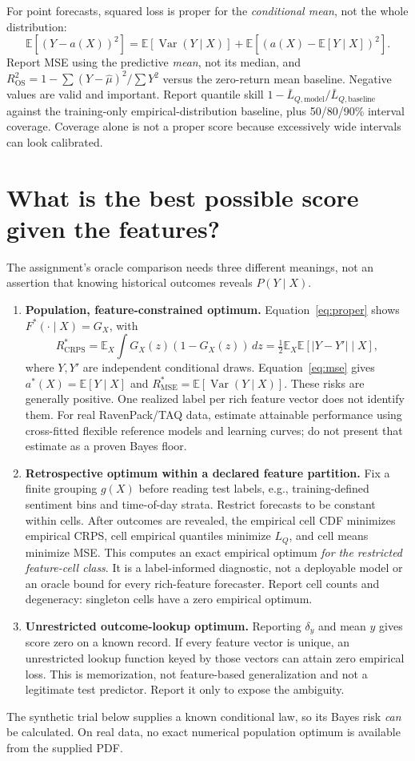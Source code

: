 \documentclass[11pt,letterpaper]{article}
\newcommand{\E}{\mathbb{E}}
\newcommand{\CRPS}{\operatorname{CRPS}}
\newcommand{\MSE}{\operatorname{MSE}}
\newcommand{\Var}{\operatorname{Var}}
\begin{document}
For point forecasts, squared loss is proper for the \emph{conditional mean}, not the whole distribution:
\begin{equation}
\E[(Y-a(X))^2]=\E[\Var(Y\mid X)]+\E[(a(X)-\E[Y\mid X])^2].
\label{eq:mse}
\end{equation}
Report MSE using the predictive \emph{mean}, not its median, and
$R^2_{\mathrm{OS}}=1-\sum(Y-\widehat\mu)^2/\sum Y^2$ versus the zero-return mean baseline. Negative values are valid and important. Report quantile skill $1-\bar L_{Q,\mathrm{model}}/\bar L_{Q,\mathrm{baseline}}$ against the training-only empirical-distribution baseline, plus 50/80/90\% interval coverage. Coverage alone is not a proper score because excessively wide intervals can look calibrated.

\section{What is the best possible score given the features?}
The assignment's oracle comparison needs three different meanings, not an assertion that knowing historical outcomes reveals $P(Y\mid X)$.
\begin{enumerate}
\item \textbf{Population, feature-constrained optimum.} Equation~\eqref{eq:proper} shows $F^*(\cdot\mid X)=G_X$, with
\begin{equation}
R^*_{\CRPS}=\E_X\int G_X(z)(1-G_X(z))\,dz
=\tfrac12\E_X\E[|Y-Y'|\mid X],
\end{equation}
where $Y,Y'$ are independent conditional draws. Equation~\eqref{eq:mse} gives $a^*(X)=\E[Y\mid X]$ and $R^*_{\MSE}=\E[\Var(Y\mid X)]$. These risks are generally positive. One realized label per rich feature vector does not identify them. For real RavenPack/TAQ data, estimate attainable performance using cross-fitted flexible reference models and learning curves; do not present that estimate as a proven Bayes floor.
\item \textbf{Retrospective optimum within a declared feature partition.} Fix a finite grouping $g(X)$ before reading test labels, e.g., training-defined sentiment bins and time-of-day strata. Restrict forecasts to be constant within cells. After outcomes are revealed, the empirical cell CDF minimizes empirical CRPS, cell empirical quantiles minimize $L_Q$, and cell means minimize MSE. This computes an exact empirical optimum \emph{for the restricted feature-cell class}. It is a label-informed diagnostic, not a deployable model or an oracle bound for every rich-feature forecaster. Report cell counts and degeneracy: singleton cells have a zero empirical optimum.
\item \textbf{Unrestricted outcome-lookup optimum.} Reporting $\delta_y$ and mean $y$ gives score zero on a known record. If every feature vector is unique, an unrestricted lookup function keyed by those vectors can attain zero empirical loss. This is memorization, not feature-based generalization and not a legitimate test predictor. Report it only to expose the ambiguity.
\end{enumerate}
The synthetic trial below supplies a known conditional law, so its Bayes risk \emph{can} be calculated. On real data, no exact numerical population optimum is available from the supplied PDF.
\end{document}
